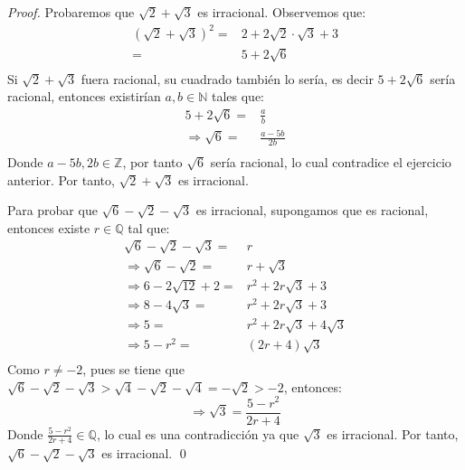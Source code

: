 \documentclass[12pt]{article}
\begin{document}
\begin{enumerate}
    \begin{proof}
        Probaremos que $\sqrt{2}+\sqrt{3}$ es irracional. Observemos que:
        \begin{equation*}
            \begin{split}
                \left(\sqrt{2}+\sqrt{3}\right)^2=&2+2\sqrt{2}\cdot\sqrt{3}+3\\
                =&5+2\sqrt{6}\\
            \end{split}
        \end{equation*}
        Si $\sqrt{2}+\sqrt{3}$ fuera racional, su cuadrado también lo sería, es decir $5+2\sqrt{6}$ sería racional, entonces existirían $a,b\in\mathbb{N}$ tales que:
        \begin{equation*}
            \begin{split}
                5+2\sqrt{6}=&\frac{a}{b}\\
                \Rightarrow \sqrt{6}=&\frac{a-5b}{2b}\\
            \end{split}
        \end{equation*}
        Donde $a-5b,2b\in\mathbb{Z}$, por tanto $\sqrt{6}$ sería racional, lo cual contradice el ejercicio anterior. Por tanto, $\sqrt{2}+\sqrt{3}$ es irracional.

        Para probar que $\sqrt{6}-\sqrt{2}-\sqrt{3}$ es irracional, supongamos que es racional, entonces existe $r\in\mathbb{Q}$ tal que:
        \begin{equation*}
            \begin{split}
                \sqrt{6}-\sqrt{2}-\sqrt{3} =& r\\
                \Rightarrow \sqrt{6}-\sqrt{2} =& r+\sqrt{3}\\
                \Rightarrow 6-2\sqrt{12}+2 =& r^2+2r\sqrt{3}+3\\
                \Rightarrow 8-4\sqrt{3} =& r^2+2r\sqrt{3}+3\\
                \Rightarrow 5 =& r^2+2r\sqrt{3}+4\sqrt{3}\\
                \Rightarrow 5-r^2 =& (2r+4)\sqrt{3}\\
            \end{split}
        \end{equation*}
        Como $r\neq -2$, pues se tiene que $\sqrt{6}-\sqrt{2}-\sqrt{3}>\sqrt{4}-\sqrt{2}-\sqrt{4}=-\sqrt{2}>-2$, entonces:
        \begin{equation*}
            \Rightarrow \sqrt{3}=\frac{5-r^2}{2r+4}
        \end{equation*}
        Donde $\frac{5-r^2}{2r+4}\in\mathbb{Q}$, lo cual es una contradicción ya que $\sqrt{3}$ es irracional. Por tanto, $\sqrt{6}-\sqrt{2}-\sqrt{3}$ es irracional.
        \qed
    \end{proof}
\end{enumerate}
\end{document}
